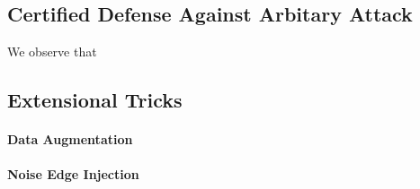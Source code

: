 \subsection{Certified Defense Against Arbitary Attack}
We observe that 
\subsection{Extensional Tricks}
\paragraph{Data Augmentation}
\paragraph{Noise Edge Injection}

